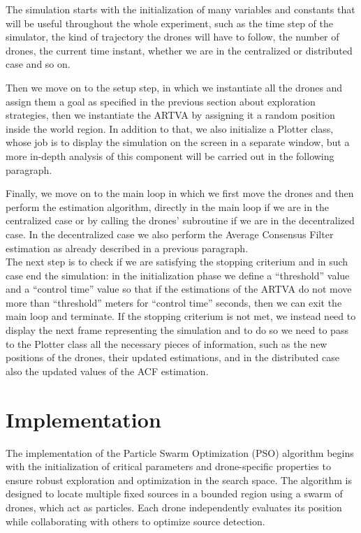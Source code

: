 The simulation starts with the initialization of many variables and constants that will be useful throughout the whole experiment, such as the time step of the simulator, the kind of trajectory the drones will have to follow, the number of drones, the current time instant, whether we are in the centralized or distributed case and so on.

Then we move on to the setup step, in which we instantiate all the drones and assign them a goal as specified in the previous section about exploration strategies, then we instantiate the ARTVA by assigning it a random position inside the world region. In addition to that, we also initialize a Plotter class, whose job is to display the simulation on the screen in a separate window, but a more in-depth analysis of this component will be carried out in the following paragraph.

Finally, we move on to the main loop in which we first move the drones and then perform the estimation algorithm, directly in the main loop if we are in the centralized case or by calling the drones’ subroutine if we are in the decentralized case. In the decentralized case we also perform the Average Consensus Filter estimation as already described in a previous paragraph.\\
The next step is to check if we are satisfying the stopping criterium and in such case end the simulation: in the initialization phase we define a “threshold” value and a “control time” value so that if the estimations of the ARTVA do not move more than “threshold” meters for “control time” seconds, then we can exit the main loop and terminate. If the stopping criterium is not met, we instead need to display the next frame representing the simulation and to do so we need to pass to the Plotter class all the necessary pieces of information, such as the new positions of the drones, their updated estimations, and in the distributed case also the updated values of the ACF estimation. 
\section{Implementation}

The implementation of the Particle Swarm Optimization (PSO) algorithm begins with the initialization of critical parameters and drone-specific properties to ensure robust exploration and optimization in the search space. The algorithm is designed to locate multiple fixed sources in a bounded region using a swarm of drones, which act as particles. Each drone independently evaluates its position while collaborating with others to optimize source detection. 


